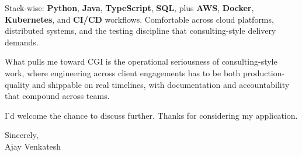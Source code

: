 \documentclass[letterpaper,11pt]{article}
\begin{document}
Stack-wise: \textbf{Python}, \textbf{Java}, \textbf{TypeScript}, \textbf{SQL}, plus \textbf{AWS}, \textbf{Docker}, \textbf{Kubernetes}, and \textbf{CI/CD} workflows. Comfortable across cloud platforms, distributed systems, and the testing discipline that consulting-style delivery demands.

What pulls me toward CGI is the operational seriousness of consulting-style work, where engineering across client engagements has to be both production-quality and shippable on real timelines, with documentation and accountability that compound across teams.

I'd welcome the chance to discuss further. Thanks for considering my application.

\vspace{12pt}
Sincerely, \\
Ajay Venkatesh
\end{document}
